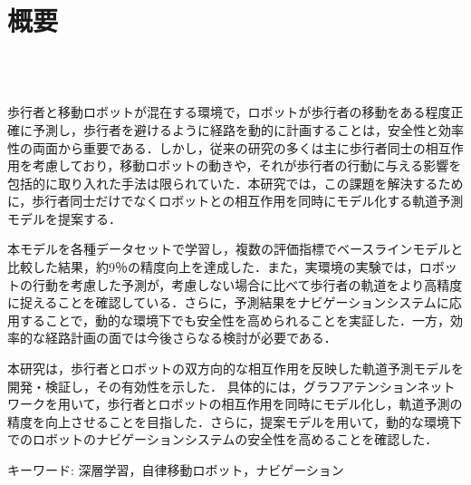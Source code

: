 \chapter*{概要}
\thispagestyle{empty}
%
\begin{center}
  \scalebox{1.5}{移動ロボットのための深層学習を用いた}\\
  \scalebox{1.5}{歩行者の位置予測とナビゲーションへの応用}\\
\end{center}
\vspace{1.0zh}
%

歩行者と移動ロボットが混在する環境で，ロボットが歩行者の移動をある程度正確に予測し，歩行者を避けるように経路を動的に計画することは，安全性と効率性の両面から重要である．しかし，従来の研究の多くは主に歩行者同士の相互作用を考慮しており，移動ロボットの動きや，それが歩行者の行動に与える影響を包括的に取り入れた手法は限られていた．本研究では，この課題を解決するために，歩行者同士だけでなくロボットとの相互作用を同時にモデル化する軌道予測モデルを提案する．

本モデルを各種データセットで学習し，複数の評価指標でベースラインモデルと比較した結果，約9％の精度向上を達成した．また，実環境の実験では，ロボットの行動を考慮した予測が，考慮しない場合に比べて歩行者の軌道をより高精度に捉えることを確認している．さらに，予測結果をナビゲーションシステムに応用することで，動的な環境下でも安全性を高められることを実証した．一方，効率的な経路計画の面では今後さらなる検討が必要である．

本研究は，歩行者とロボットの双方向的な相互作用を反映した軌道予測モデルを開発・検証し，その有効性を示した．
具体的には，グラフアテンションネットワークを用いて，歩行者とロボットの相互作用を同時にモデル化し，軌道予測の精度を向上させることを目指した．さらに，提案モデルを用いて，動的な環境下でのロボットのナビゲーションシステムの安全性を高めることを確認した．

\begin{flushleft}
キーワード: 深層学習，自律移動ロボット，ナビゲーション
\end{flushleft}
%
\newpage
